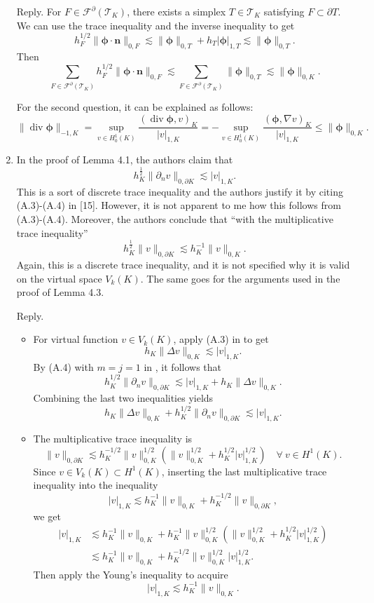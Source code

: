 \documentclass[10pt]{amsart}
\theoremstyle{definition}
\theoremstyle{remark}
\renewcommand{\div}{\operatorname{div}}
\begin{document}
\begin{enumerate}[1.]
\smallskip \noindent \textcolor[rgb]{1.00,0.00,0.00}{Reply.}
For $F\in\mathcal F^{\partial}(\mathcal T_K)$, there exists a simplex $T\in\mathcal T_K$ satisfying $F\subset\partial T$. We can use the trace inequality \cite[(2.18)]{BrennerSung2018} and the inverse inequality to get
$$
h_F^{1/2}\|\boldsymbol{\phi}\cdot\boldsymbol{n}\|_{0,F} \lesssim \|\boldsymbol{\phi}\|_{0,T}+h_T|\boldsymbol{\phi}|_{1,T}\lesssim \|\boldsymbol{\phi}\|_{0,T}.
$$ 
Then
$$
\sum_{F\in\mathcal F^{\partial}(\mathcal T_K)}h_F^{1/2}\|\boldsymbol{\phi}\cdot\boldsymbol{n}\|_{0,F} \lesssim \sum_{F\in\mathcal F^{\partial}(\mathcal T_K)}\|\boldsymbol{\phi}\|_{0,T}\lesssim \|\boldsymbol{\phi}\|_{0,K}.
$$ 

For the second question, it can be explained as follows:
$$
\|\div\boldsymbol{\phi}\|_{-1,K}=\sup_{v\in H_0^1(K)}\frac{(\div\boldsymbol{\phi}, v)_K}{|v|_{1,K}}=-\sup_{v\in H_0^1(K)}\frac{(\boldsymbol{\phi}, \nabla v)_K}{|v|_{1,K}} \leq \|\boldsymbol{\phi}\|_{0,K}.
$$

\medskip

\item \textsf{In the proof of Lemma 4.1, the authors claim that
$$
h_K^{\frac{1}{2}}\|\partial_nv\|_{0,\partial K}\lesssim |v|_{1,K}.
$$
This is a sort of discrete trace inequality and the authors justify it by citing (A.3)-(A.4) in [15]. However, it is not apparent to me how this follows from (A.3)-(A.4). Moreover, the authors conclude that “with the multiplicative trace inequality”
$$
h_K^{\frac{1}{2}}\|v\|_{0,\partial K}\lesssim h_K^{-1}\|v\|_{0,K}.
$$
Again, this is a discrete trace inequality, and it is not specified why it is valid on the virtual space $V_k(K)$. The same goes for the arguments used in the proof of Lemma 4.3.}

\smallskip \noindent \textcolor[rgb]{1.00,0.00,0.00}{Reply.}
\begin{itemize}
    \item 
For virtual function $v\in V_k(K)$, apply (A.3) in \cite{ChenHuang2020ncvem} to get
\[
h_K\|\Delta v\|_{0,K}\lesssim |v|_{1,K}.
\]
By (A.4) with $m=j=1$ in \cite{ChenHuang2020ncvem}, it follows that
\[
h_K^{1/2}\|\partial_nv\|_{0,\partial K}\lesssim |v|_{1,K}+h_K\|\Delta v\|_{0,K}.
\]
Combining the last two inequalities yields
\[
h_K\|\Delta v\|_{0,K}+h_K^{1/2}\|\partial_nv\|_{0,\partial K}\lesssim |v|_{1,K}.
\]
\item The multiplicative trace inequality is
\[
\|v\|_{0,\partial K}\lesssim h_K^{-1/2}\|v\|_{0,K}^{1/2}(\|v\|_{0,K}^{1/2}+h_K^{1/2}|v|_{1,K}^{1/2}) \quad\forall~v\in H^1(K).
\]
Since $v\in V_k(K)\subset H^1(K)$, inserting the last multiplicative trace inequality into the inequality
\[
|v|_{1,K}\lesssim h_K^{-1}\|v\|_{0,K}+h_K^{-1/2}\|v\|_{0,\partial K},
\]
we get
\begin{align*}
|v|_{1,K}&\lesssim h_K^{-1}\|v\|_{0,K}+h_K^{-1}\|v\|_{0,K}^{1/2}(\|v\|_{0,K}^{1/2}+h_K^{1/2}|v|_{1,K}^{1/2}) \\
&\lesssim h_K^{-1}\|v\|_{0,K}+h_K^{-1/2}\|v\|_{0,K}^{1/2}|v|_{1,K}^{1/2}.
\end{align*}
Then apply the Young's inequality to acquire
\[
|v|_{1,K}\lesssim h_K^{-1}\|v\|_{0,K}.
\]
\end{itemize}



\end{enumerate}
\end{document}
